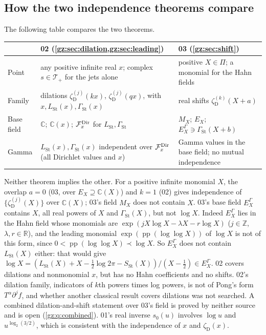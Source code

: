 \documentclass[11pt,a4paper]{article}
\numberwithin{equation}{section}
\theoremstyle{definition}
\theoremstyle{remark}
\newcommand{\R}{\mathbb R}
\newcommand{\C}{\mathbb C}
\newcommand{\Z}{\mathbb Z}
\newcommand{\pp}{\operatorname{pp}}
\newcommand{\LSt}{L_{\mathrm{St}}}
\newcommand{\GSt}{\Gamma_{\mathrm{St}}}
\newcommand{\SSt}{S_{\mathrm{St}}}
\newcommand{\zD}{\zeta_{\mathrm D}}
\newcommand{\Tp}{\mathcal T_{+}}
\begin{document}
\subsection{How the two independence theorems compare}\label{gz:sec:indep-compare}
The following table compares the two theorems.
\begin{center}\small
\begin{tabular}{@{}P{0.13\textwidth}P{0.40\textwidth}P{0.40\textwidth}@{}}
\toprule
 & 02 (\cref{gz:sec:dilation,gz:sec:leading}) & 03 (\cref{gz:sec:shift})\\
\midrule
Point & any positive infinite real $x$; complex $s\in\Tp$ for the jets alone & positive $X\in\Pi$; a monomial for the Hahn fields\\
Family & dilations $\zD^{(j)}(kx)$, $\zD^{(j)}(qx)$, with $x,\LSt(x),\GSt(x)$ & real shifts $\zD^{(k)}(X+a)$\\
Base field & $\C$; $\C(x)$; $\mathcal F_x^{\rm Dir}$ for $\LSt,\GSt$ & $M_X$; $E_X$; $E_X^\Gamma\ni\GSt(X+b)$\\
Gamma & $\LSt(x),\GSt(x)$ independent over $\mathcal F_x^{\rm Dir}$ (all Dirichlet values and $x$) & Gamma values in the base field; no mutual independence\\
\bottomrule
\end{tabular}
\end{center}
Neither theorem implies the other. For a positive infinite monomial $X$,
the overlap $a=0$ (03, over $E_X\supseteq\C(X)$) and $k=1$ (02) gives
independence of $\{\zD^{(j)}(X)\}$ over $\C(X)$; 03's field $M_X$ does not
contain $X$. 03's base field $E_X^\Gamma$ contains $X$, all real powers of
$X$ and $\GSt(X)$, but not $\log X$. Indeed $E_X^\Gamma$ lies in the Hahn
field whose monomials are $\exp(jX\log X-\lambda X-r\log X)$ ($j\in\Z$,
$\lambda,r\in\R$), and the leading monomial $\exp(\pp(\log\log X))$ of
$\log X$ is not of this form, since $0<\pp(\log\log X)\prec\log X$. So
$E_X^\Gamma$ does not contain $\LSt(X)$ either: that would give
$\log X=(\LSt(X)+X-\tfrac12\log2\pi-\SSt(X))/(X-\tfrac12)\in E_X^\Gamma$.
02 covers dilations and nonmonomial $x$, but has no Hahn
coefficients and no shifts. 02's dilation family, indicators of $k$th powers
times log powers, is not of Pong's form $T^\alpha\partial^jf$, and whether
another classical result covers dilations was not searched. A combined
dilation-and-shift statement over 03's field is proved by neither source and
is open (\cref{gz:q:combined}). 01's real inverse $s_0(u)$ involves
$\log u$ and $u^{\log_2(3/2)}$, which is consistent with the independence
of $x$ and $\zD(x)$.
\end{document}
